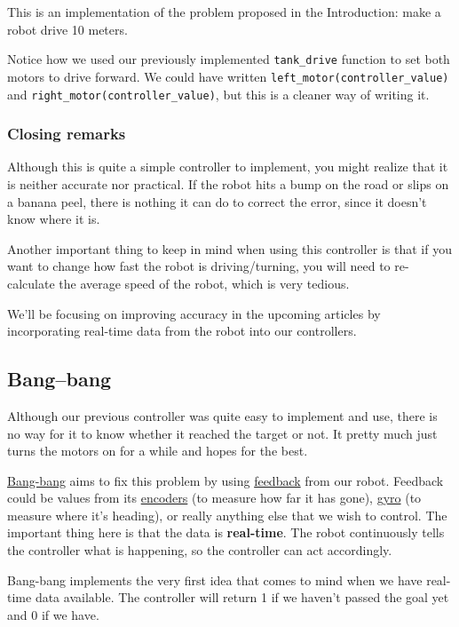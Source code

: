 \documentclass[12pt,twoside]{article}
\begin{document}
This is an implementation of the problem proposed in the Introduction: make a robot drive 10 meters.

Notice how we used our previously implemented \texttt{tank\_drive} function to set both motors to drive forward. We could have written \texttt{left\_motor(controller\_value)} and \texttt{right\_motor(controller\_value)}, but this is a cleaner way of writing it.


\subsubsection{Closing remarks}
Although this is quite a simple controller to implement, you might realize that it is neither accurate nor practical. If the robot hits a bump on the road or slips on a banana peel, there is nothing it can do to correct the error, since it doesn't know where it is.

Another important thing to keep in mind when using this controller is that if you want to change how fast the robot is driving/turning, you will need to re-calculate the average speed of the robot, which is very tedious.

We'll be focusing on improving accuracy in the upcoming articles by incorporating real-time data from the robot into our controllers.




\subsection{Bang–bang}
Although our previous controller was quite easy to implement and use, there is no way for it to know whether it reached the target or not. It pretty much just turns the motors on for a while and hopes for the best.

\href{https://en.wikipedia.org/wiki/Bang\%E2\%80\%93bang_control}{Bang-bang} aims to fix this problem by using \href{https://en.wikipedia.org/wiki/Feedback}{feedback} from our robot. Feedback could be values from its \href{https://en.wikipedia.org/wiki/Encoder}{encoders} (to measure how far it has gone), \href{https://en.wikipedia.org/wiki/Gyroscope}{gyro} (to measure where it's heading), or really anything else that we wish to control. The important thing here is that the data is \textbf{real-time}. The robot continuously tells the controller what is happening, so the controller can act accordingly.

Bang-bang implements the very first idea that comes to mind when we have real-time data available. The controller will return 1 if we haven't passed the goal yet and 0 if we have.
\end{document}

